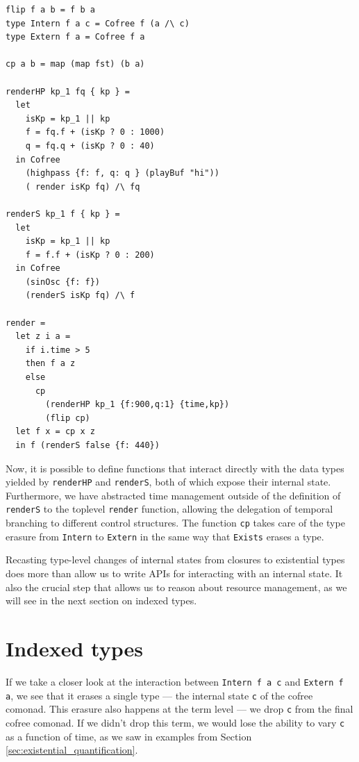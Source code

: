 \documentclass{article}
\begin{document}
\lstset{language=Haskell, style=psstyle}
\begin{lstlisting}
flip f a b = f b a
type Intern f a c = Cofree f (a /\ c)
type Extern f a = Cofree f a

cp a b = map (map fst) (b a)

renderHP kp_1 fq { kp } =
  let
    isKp = kp_1 || kp
    f = fq.f + (isKp ? 0 : 1000)
    q = fq.q + (isKp ? 0 : 40)
  in Cofree
    (highpass {f: f, q: q } (playBuf "hi"))
    ( render isKp fq) /\ fq

renderS kp_1 f { kp } =
  let
    isKp = kp_1 || kp
    f = f.f + (isKp ? 0 : 200)
  in Cofree
    (sinOsc {f: f})
    (renderS isKp fq) /\ f

render =
  let z i a =
    if i.time > 5
    then f a z
    else
      cp
        (renderHP kp_1 {f:900,q:1} {time,kp})
        (flip cp)
  let f x = cp x z
  in f (renderS false {f: 440})
\end{lstlisting}

Now, it is possible to define functions that interact directly with the data types yielded by \texttt{renderHP} and \texttt{renderS}, both of which expose their internal state. Furthermore, we have abstracted time management outside of the definition of \texttt{renderS} to the toplevel \texttt{render} function, allowing the delegation of temporal branching to different control structures. The function \texttt{cp} takes care of the type erasure from \texttt{Intern} to \texttt{Extern} in the same way that \texttt{Exists} erases a type.

Recasting type-level changes of internal states from closures to existential types does more than allow us to write APIs for interacting with an internal state. It also the crucial step that allows us to reason about resource management, as we will see in the next section on indexed types.

\section{Indexed types}
\label{sec:indexed_types}

If we take a closer look at the interaction between \texttt{Intern f a c} and \texttt{Extern f a}, we see that it erases a single type --- the internal state \texttt{c} of the cofree comonad. This erasure also happens at the term level --- we drop \texttt{c} from the final cofree comonad. If we didn't drop this term, we would lose the ability to vary \texttt{c} as a function of time, as we saw in examples from Section \ref{sec:existential_quantification}.
\end{document}
